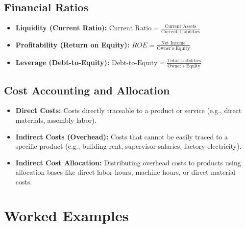 \documentclass[12pt,a4paper]{article}
\begin{document}
\subsection{Financial Ratios}
\begin{itemize}[leftmargin=*, itemsep=6pt]
  \item \textbf{Liquidity (Current Ratio):} $\text{Current Ratio} = \displaystyle\frac{\text{Current Assets}}{\text{Current Liabilities}}$
  \item \textbf{Profitability (Return on Equity):} $ROE = \displaystyle\frac{\text{Net Income}}{\text{Owner's Equity}}$
  \item \textbf{Leverage (Debt-to-Equity):} $\text{Debt-to-Equity} = \displaystyle\frac{\text{Total Liabilities}}{\text{Owner's Equity}}$
\end{itemize}

\subsection{Cost Accounting and Allocation}
\begin{itemize}[leftmargin=*, itemsep=4pt]
  \item \textbf{Direct Costs:} Costs directly traceable to a product or service (e.g., direct materials, assembly labor).
  \item \textbf{Indirect Costs (Overhead):} Costs that cannot be easily traced to a specific product (e.g., building rent, supervisor salaries, factory electricity).
  \item \textbf{Indirect Cost Allocation:} Distributing overhead costs to products using allocation bases like direct labor hours, machine hours, or direct material costs.
\end{itemize}

\section{Worked Examples}
\end{document}
